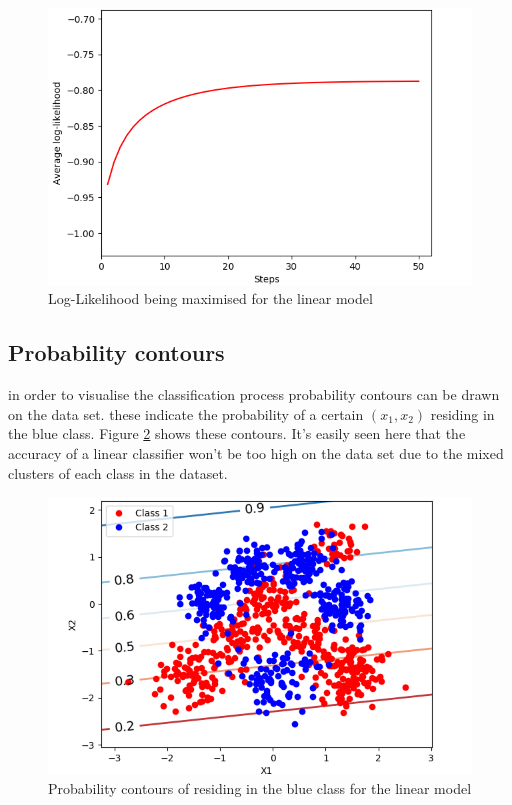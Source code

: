 \documentclass[twoside,twocolumn]{article}
\begin{document}
\begin{figure}[h]
  \centering
    \includegraphics[width=\linewidth]{linearlog}
  \caption{Log-Likelihood being maximised for the linear model}
  \label{fig:T1}
\end{figure}


\subsection{Probability contours}
in order to visualise the classification process probability contours can be drawn on the data set. these indicate the probability of a certain $(x_1,x_2)$ residing in the blue class. Figure \ref{fig:C1} shows these contours. It's easily seen here that the accuracy of a linear classifier won't be too high on the data set due to the mixed clusters of each class in the dataset.

\begin{figure}[h]
  \centering
    \includegraphics[width=\linewidth]{linearcontour}
  \caption{Probability contours of residing in the blue class for the linear model}
  \label{fig:C1}
\end{figure}
\end{document}
